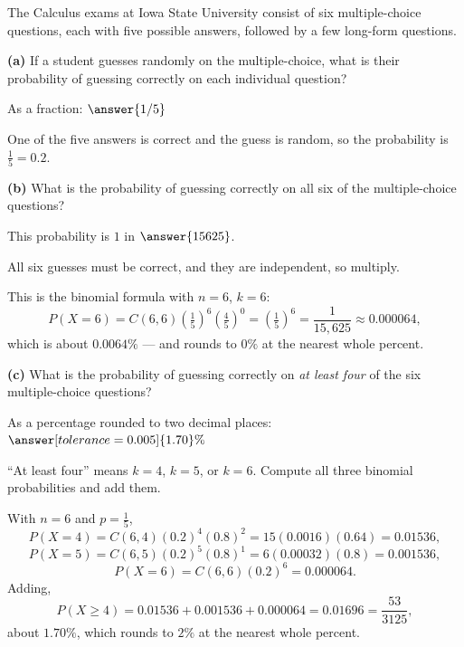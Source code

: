 \documentclass[12pt]{ximera}
\begin{document}
\begin{problem}
The Calculus exams at Iowa State University consist of six multiple-choice questions,
each with five possible answers, followed by a few long-form questions.

\begin{prompt}
\textbf{(a)} If a student guesses randomly on the multiple-choice, what is their
probability of guessing correctly on each individual question?

As a fraction: $\answer{1/5}$

\begin{feedback}
One of the five answers is correct and the guess is random, so the probability is
$\frac15=0.2$.
\end{feedback}
\end{prompt}

\begin{prompt}
\textbf{(b)} What is the probability of guessing correctly on all six of the
multiple-choice questions?

This probability is $1$ in $\answer{15625}$.

\begin{hint}
All six guesses must be correct, and they are independent, so multiply.
\end{hint}

\begin{feedback}
This is the binomial formula with $n=6$, $k=6$:
\[
P(X=6)=C(6,6)\left(\tfrac15\right)^6\left(\tfrac45\right)^0=\left(\tfrac15\right)^6
=\frac{1}{15{,}625}\approx 0.000064,
\]
which is about $0.0064\%$ --- and rounds to $0\%$ at the nearest whole percent.
\end{feedback}
\end{prompt}

\begin{prompt}
\textbf{(c)} What is the probability of guessing correctly on \emph{at least four} of
the six multiple-choice questions?

As a percentage rounded to two decimal places: $\answer[tolerance=0.005]{1.70}\%$

\begin{hint}
``At least four'' means $k=4$, $k=5$, or $k=6$. Compute all three binomial
probabilities and add them.
\end{hint}

\begin{feedback}
With $n=6$ and $p=\frac15$,
\[
P(X=4)=C(6,4)(0.2)^4(0.8)^2 = 15(0.0016)(0.64)=0.01536,
\]
\[
P(X=5)=C(6,5)(0.2)^5(0.8)^1 = 6(0.00032)(0.8)=0.001536,
\]
\[
P(X=6)=C(6,6)(0.2)^6 = 0.000064.
\]
Adding,
\[
P(X\ge 4)=0.01536+0.001536+0.000064=0.01696=\frac{53}{3125},
\]
about $1.70\%$, which rounds to $2\%$ at the nearest whole percent.
\end{feedback}
\end{prompt}
\end{problem}
\end{document}
